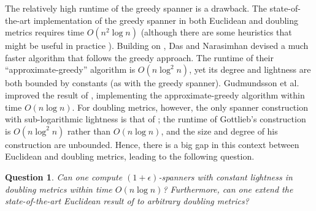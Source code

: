 \documentclass[11pt,letterpaper]{article}
\newtheorem{question}{Question}
\newcommand{\eps}{\epsilon}
\begin{document}
The relatively high runtime of the greedy spanner is a drawback.
The state-of-the-art implementation of the greedy spanner in both Euclidean and doubling metrics requires time $O(n^2 \log n)$ \cite{BCFMS10} (although there are some heuristics that might be useful in practice \cite{ABBB15,ABBB17}).
Building on \cite{DHN93}, Das and Narasimhan \cite{DN97} devised a much faster algorithm that follows the greedy approach.
The runtime of their ``approximate-greedy'' algorithm is $O(n \log^2 n)$, yet its degree and lightness are both bounded by constants (as with the greedy spanner).
Gudmundsson et al.\ \cite{GLN02} improved the result of \cite{DN97}, implementing the approximate-greedy algorithm within time $O(n \log n)$.
For doubling metrics, however, the only spanner construction with sub-logarithmic lightness is that of   \cite{Got15};
the runtime of Gottlieb's construction is $O(n \log^2 n)$ rather than $O(n \log n)$, and the size and degree of his construction are unbounded.
Hence, there is a big gap in this context between Euclidean and doubling metrics, leading to the following question.
\begin{question} \label{question3}
	Can one compute $(1+\eps)$-spanners with constant lightness in doubling metrics  within time $O(n \log n)$?
	Furthermore, can one extend the state-of-the-art Euclidean result of \cite{GLN02} to arbitrary doubling metrics?
\end{question}	
\end{document}
